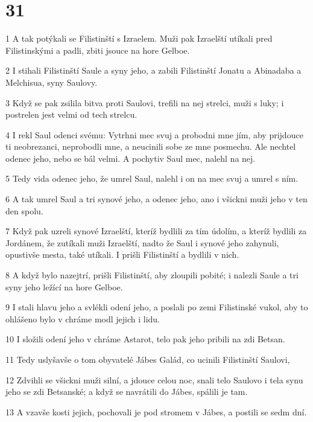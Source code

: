 \chapter{31}

\par 1 A tak potýkali se Filistinští s Izraelem. Muži pak Izraelští utíkali pred Filistinskými a padli, zbiti jsouce na hore Gelboe.
\par 2 I stihali Filistinští Saule a syny jeho, a zabili Filistinští Jonatu a Abinadaba a Melchisua, syny Saulovy.
\par 3 Když se pak zsilila bitva proti Saulovi, trefili na nej strelci, muži s luky; i postrelen jest velmi od tech strelcu.
\par 4 I rekl Saul odenci svému: Vytrhni mec svuj a probodni mne jím, aby prijdouce ti neobrezanci, neprobodli mne, a neucinili sobe ze mne posmechu. Ale nechtel odenec jeho, nebo se bál velmi. A pochytiv Saul mec, nalehl na nej.
\par 5 Tedy vida odenec jeho, že umrel Saul, nalehl i on na mec svuj a umrel s ním.
\par 6 A tak umrel Saul a tri synové jeho, a odenec jeho, ano i všickni muži jeho v ten den spolu.
\par 7 Když pak uzreli synové Izraelští, kteríž bydlili za tím údolím, a kteríž bydlili za Jordánem, že zutíkali muži Izraelští, nadto že Saul i synové jeho zahynuli, opustivše mesta, také utíkali. I prišli Filistinští a bydlili v nich.
\par 8 A když bylo nazejtrí, prišli Filistinští, aby zloupili pobité; i nalezli Saule a tri syny jeho ležící na hore Gelboe.
\par 9 I stali hlavu jeho a svlékli odení jeho, a poslali po zemi Filistinské vukol, aby to ohlášeno bylo v chráme modl jejich i lidu.
\par 10 I složili odení jeho v chráme Astarot, telo pak jeho pribili na zdi Betsan.
\par 11 Tedy uslyšavše o tom obyvatelé Jábes Galád, co ucinili Filistinští Saulovi,
\par 12 Zdvihli se všickni muži silní, a jdouce celou noc, snali telo Saulovo i tela synu jeho se zdi Betsanské; a když se navrátili do Jábes, spálili je tam.
\par 13 A vzavše kosti jejich, pochovali je pod stromem v Jábes, a postili se sedm dní.

